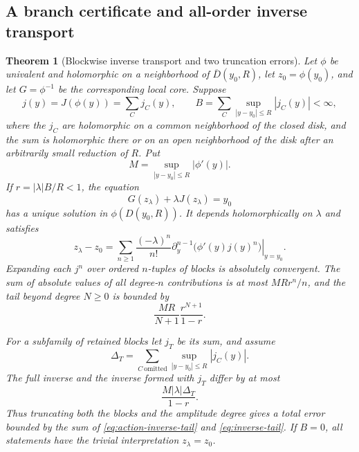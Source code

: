 \documentclass[11pt,a4paper]{article}
\numberwithin{equation}{section}
\newtheorem{theorem}{Theorem}[section]
\theoremstyle{definition}
\theoremstyle{remark}
\begin{document}
\subsection{A branch certificate and all-order inverse transport}
\begin{theorem}[Blockwise inverse transport and two truncation errors]
\label{thm:inverse}
Let $\phi$ be univalent and holomorphic on a neighborhood of
$\overline D(y_0,R)$, let $z_0=\phi(y_0)$, and let $G=\phi^{-1}$ be the
corresponding local core. Suppose
\begin{equation}
 j(y)=J(\phi(y))=\sum_C j_C(y),\qquad
 B=\sum_C\sup_{|y-y_0|\le R}|j_C(y)|<\infty,
 \label{eq:Bnorm}
\end{equation}
where the $j_C$ are holomorphic on a common neighborhood of the closed
disk, and the sum is holomorphic there or on an open neighborhood of the
disk after an arbitrarily small reduction of $R$. Put
\[
 M=\sup_{|y-y_0|\le R}|\phi'(y)|.
\]
If $r=|\lambda|B/R<1$, the equation
\begin{equation}
 G(z_\lambda)+\lambda J(z_\lambda)=y_0
 \label{eq:inverse-equation}
\end{equation}
has a unique solution in $\phi(D(y_0,R))$. It depends holomorphically on
$\lambda$ and satisfies
\begin{equation}
 z_\lambda-z_0
 =\sum_{n\ge1}\frac{(-\lambda)^n}{n!}
   \left.\partial_y^{n-1}\bigl(\phi'(y)j(y)^n\bigr)\right|_{y=y_0}.
 \label{eq:inverse-series}
\end{equation}
Expanding each $j^n$ over ordered $n$-tuples of blocks is absolutely
convergent. The sum of absolute values of all degree-$n$ contributions
is at most $MRr^n/n$, and the tail beyond degree $N\ge0$ is bounded by
\begin{equation}
 \frac{MR}{N+1}\frac{r^{N+1}}{1-r}.
 \label{eq:inverse-tail}
\end{equation}

For a subfamily of retained blocks let $j_T$ be its sum, and assume
\begin{equation}
 \Delta_T=\sum_{C\ \mathrm{omitted}}
        \sup_{|y-y_0|\le R}|j_C(y)|.
 \label{eq:Delta}
\end{equation}
The full inverse and the inverse formed with $j_T$ differ by at most
\begin{equation}
 \frac{M|\lambda|\Delta_T}{1-r}.
 \label{eq:action-inverse-tail}
\end{equation}
Thus truncating both the blocks and the amplitude degree gives a total
error bounded by the sum of \eqref{eq:action-inverse-tail} and
\eqref{eq:inverse-tail}. If $B=0$, all statements have the trivial
interpretation $z_\lambda=z_0$.
\end{theorem}
\end{document}
